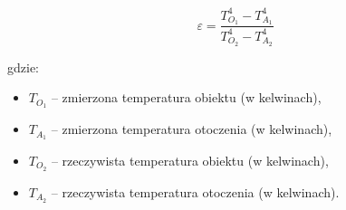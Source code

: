 \[
\varepsilon = \frac{T_{O_1}^4 - T_{A_1}^4}{T_{O_2}^4 - T_{A_2}^4}
\]

gdzie:
\begin{itemize}
    \item $T_{O_1}$ – zmierzona temperatura obiektu (w kelwinach),
    \item $T_{A_1}$ – zmierzona temperatura otoczenia (w kelwinach),
    \item $T_{O_2}$ – rzeczywista temperatura obiektu (w kelwinach),
    \item $T_{A_2}$ – rzeczywista temperatura otoczenia (w kelwinach).
\end{itemize}



    

    
